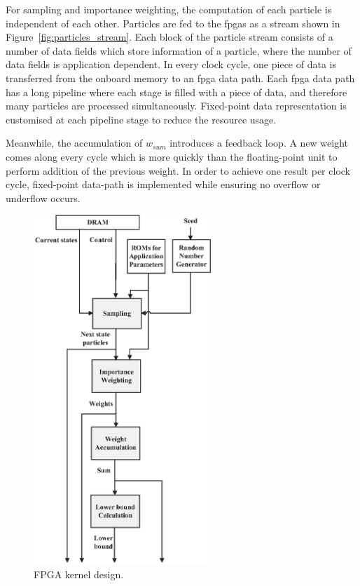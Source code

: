 For sampling and importance weighting, the computation of each particle is independent of each other.
Particles are fed to the \glspl{fpga} as a stream shown in Figure~\ref{fig:particles_stream}.
Each block of the particle stream consists of a number of data fields which store information of a particle, where the number of data fields is application dependent.
In every clock cycle, one piece of data is transferred from the onboard memory to an \gls{fpga} data path.
Each \gls{fpga} data path has a long pipeline where each stage is filled with a piece of data, and therefore many particles are processed simultaneously.
Fixed-point data representation is customised at each pipeline stage to reduce the resource usage.

Meanwhile, the accumulation of $w_{sum}$ introduces a feedback loop.
A new weight comes along every cycle which is more quickly than the floating-point unit to perform addition of the previous weight.
In order to achieve one result per clock cycle, fixed-point data-path is implemented while ensuring no overflow or underflow occurs.

\begin{figure}[t!]
\centering
\includegraphics[width=0.6\textwidth]{4_adaptation/figures/fig_kernel}
\caption{FPGA kernel design.}
\label{fig:reconfig_kernel}
\end{figure}

